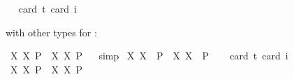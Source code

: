 \begin{isabellebody}
\ \ \isamarkupfalse%
{\isacharbrackleft}card\ {\isacharprime}t{\isacharequal}{}{\isacharcomma}\ card\ i{\isacharequal}{}{\isacharbrackright}%
\isadelimproof
\ %
\endisadelimproof
%
\isatagproof
{}\isamarkupfalse%
\ %
%
\endisatagproof
{\isafoldproof}%
%
\isadelimproof
%
\endisadelimproof
%
\begin{isamarkuptext}%
with other types for :%
\end{isamarkuptext}\isamarkuptrue%
\isamarkupfalse%
\ {\isachardoublequoteopen}{\isasymlfloor}{\isacharparenleft}{\isasymlambda}X{\isachardot}\ \isactrlbold {\isasymdiamond}\isactrlbold {\isasymexists}X{\isacharparenright}\ \isactrlbold {\isasymdown}{\isacharparenleft}P{\isacharcolon}{\isacharcolon}{\isasymup}{\isasymlangle}{\isasymup}{\isasymzero}{\isasymrangle}{\isacharparenright}\ \isactrlbold {\isasymrightarrow}\ {\isacharparenleft}{\isasymlambda}X{\isachardot}\ \isactrlbold {\isasymexists}X{\isacharparenright}\ \isactrlbold {\isasymdown}P{\isasymrfloor}{\isachardoublequoteclose}%
\isadelimproof
\ %
\endisadelimproof
%
\isatagproof
{}\isamarkupfalse%
\ simp%
\endisatagproof
{\isafoldproof}%
%
\isadelimproof
%
\endisadelimproof
\isanewline
{}\isamarkupfalse%
\ {\isachardoublequoteopen}{\isasymlfloor}{\isacharparenleft}{\isasymlambda}X{\isachardot}\ \isactrlbold {\isasymdiamond}\isactrlbold {\isasymexists}X{\isacharparenright}\ \ {\isacharparenleft}P{\isacharcolon}{\isacharcolon}{\isasymup}{\isasymlangle}{\isasymup}{\isasymzero}{\isasymrangle}{\isacharparenright}\ \isactrlbold {\isasymrightarrow}\ {\isacharparenleft}{\isasymlambda}X{\isachardot}\ \isactrlbold {\isasymexists}X{\isacharparenright}\ \ P{\isasymrfloor}{\isachardoublequoteclose}\ \isanewline
\ \ \isamarkupfalse%
{\isacharbrackleft}card\ {\isacharprime}t{\isacharequal}{}{\isacharcomma}\ card\ i{\isacharequal}{}{\isacharbrackright}%
\isadelimproof
\ %
\endisadelimproof
%
\isatagproof
{}\isamarkupfalse%
\ %
%
\endisatagproof
{\isafoldproof}%
%
\isadelimproof
%
\endisadelimproof
\isanewline
{}\isamarkupfalse%
\ {\isachardoublequoteopen}{\isasymlfloor}{\isacharparenleft}{\isasymlambda}X{\isachardot}\ \isactrlbold {\isasymdiamond}\isactrlbold {\isasymexists}X{\isacharparenright}\ \isactrlbold {\isasymdown}{\isacharparenleft}P{\isacharcolon}{\isacharcolon}{\isasymup}{\isasymlangle}{\isasymlangle}{\isasymzero}{\isasymrangle}{\isasymrangle}{\isacharparenright}\ \isactrlbold {\isasymrightarrow}\ {\isacharparenleft}{\isasymlambda}X{\isachardot}\ \isactrlbold {\isasymexists}X{\isacharparenright}\ \isactrlbold {\isasymdown}P{\isasymrfloor}{\isachardoublequoteclose}%

\end{isabellebody}
